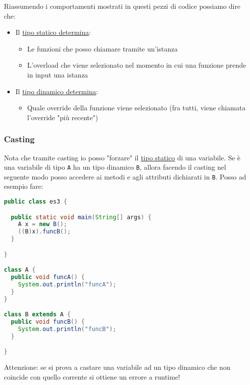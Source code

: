 Riassumendo i comportamenti mostrati in questi pezzi di codice possiamo dire che:
\begin{itemize}
	\item Il \underline{tipo statico determina}:
	      \begin{itemize}
		      \item Le funzioni che posso chiamare tramite un'istanza
		      \item L'overload che viene selezionato nel momento in cui una funzione prende in input una istanza
	      \end{itemize}
	\item Il \underline{tipo dinamico determina}:
	      \begin{itemize}
		      \item Quale override della funzione viene selezionato (fra tutti, viene chiamata l'override "più recente")
	      \end{itemize}
\end{itemize}
\subsubsection{Casting}
Nota che tramite casting io posso "forzare" il \underline{tipo statico} di una variabile. Se è una variabile di tipo \verb|A| ha un tipo dinamico \verb|B|, allora facendo il casting nel seguente modo posso accedere ai metodi e agli attributi dichiarati in \verb|B|. Posso ad esempio fare:
\begin{lstlisting}[language = java, frame = none]
public class es3 {

  public static void main(String[] args) {
    A x = new B();
    ((B)x).funcB();
  }

}

class A {
  public void funcA() {
    System.out.println("funcA");
  }
}

class B extends A {
  public void funcB() {
    System.out.println("funcB");
  }

}
\end{lstlisting}

\begin{tcolorbox}
	Attenzione: se si prova a castare una variabile ad un tipo dinamico che non coincide con quello corrente si ottiene un errore a runtime!
\end{tcolorbox}

